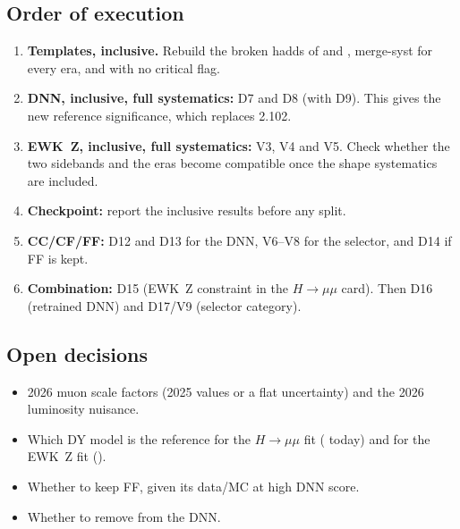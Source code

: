 \documentclass[11pt,a4paper]{article}
\begin{document}
\subsection{Order of execution}
\begin{enumerate}
  \item \textbf{Templates, inclusive.} Rebuild the broken hadds of
   and , merge-syst for
  every era, and  with no critical flag.
  \item \textbf{DNN, inclusive, full systematics:} D7 and D8 (with D9). This
  gives the new reference significance, which replaces 2.102.
  \item \textbf{EWK~Z, inclusive, full systematics:} V3, V4 and V5. Check
  whether the two sidebands and the eras become compatible once the shape
  systematics are included.
  \item \textbf{Checkpoint:} report the inclusive results before any split.
  \item \textbf{CC/CF/FF:} D12 and D13 for the DNN, V6--V8 for the selector, and
  D14 if FF is kept.
  \item \textbf{Combination:} D15 (EWK~Z constraint in the $H\to\mu\mu$ card).
  Then D16 (retrained DNN) and D17/V9 (selector category).
\end{enumerate}

\subsection{Open decisions}
\begin{itemize}
  \item 2026 muon scale factors (2025 values or a flat uncertainty) and the
  2026 luminosity nuisance.
  \item Which DY model is the reference for the $H\to\mu\mu$ fit ( today)
  and for the EWK~Z fit ().
  \item Whether to keep FF, given its data/MC at high DNN score.
  \item Whether to remove  from the DNN.
\end{itemize}

\end{document}
